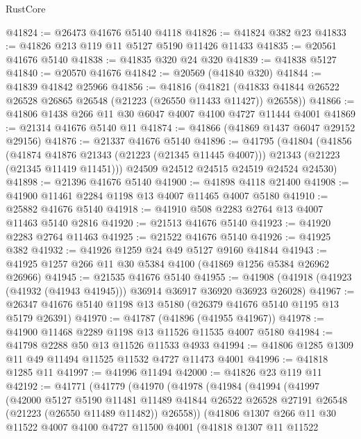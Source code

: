 \begin{lexlean}{RustCore}
\begin{coremodule}
@41824 := @26473 @41676 @5140 @4118
@41826 := @41824 @382 @23
@41833 := @41826 @213 @119 @11 @5127 @5190 @11426 @11433
@41835 := @20561 @41676 @5140
@41838 := @41835 @320 @24 @320
@41839 := @41838 @5127
@41840 := @20570 @41676
@41842 := @20569 (@41840 @320)
@41844 := @41839 @41842 @25966
@41856 := @41816
    (@41821 (@41833 @41844 @26522 @26528 @26865 @26548 (@21223 (@26550 @11433 @11427)) @26558))
@41866 := @41806 @1438 @266 @11 @30 @6047 @4007 @4100 @4727 @11444 @4001
@41869 := @21314 @41676 @5140 @11
@41874 := @41866 (@41869 @1437 @6047 @29152 @29156)
@41876 := @21337 @41676 @5140
@41896 := @41795
    (@41804
      (@41856
        (@41874 @41876 @21343 (@21223 (@21345 @11445 @4007)))
        @21343
        (@21223 (@21345 @11419 @11451)))
      @24509
      @24512
      @24515
      @24519
      @24524
      @24530)
@41898 := @21396 @41676 @5140
@41900 := @41898 @4118 @21400
@41908 := @41900 @11461 @2284 @1198 @13 @4007 @11465 @4007 @5180
@41910 := @25882 @41676 @5140
@41918 := @41910 @508 @2283 @2764 @13 @4007 @11463 @5140 @2816
@41920 := @21513 @41676 @5140
@41923 := @41920 @2283 @2764 @11463
@41925 := @21522 @41676 @5140
@41926 := @41925 @382
@41932 := @41926 @1259 @24 @49 @5127 @9160 @41844
@41943 := @41925 @1257 @266 @11 @30 @5384 @4100 (@41869 @1256 @5384 @26962 @26966)
@41945 := @21535 @41676 @5140
@41955 := @41908 (@41918 (@41923 (@41932 (@41943 @41945))) @36914 @36917 @36920 @36923 @26028)
@41967 := @26347 @41676 @5140 @1198 @13 @5180 (@26379 @41676 @5140 @1195 @13 @5179 @26391)
@41970 := @41787 (@41896 (@41955 @41967))
@41978 := @41900 @11468 @2289 @1198 @13 @11526 @11535 @4007 @5180
@41984 := @41798 @2288 @50 @13 @11526 @11533 @4933
@41994 := @41806 @1285 @1309 @11 @49 @11494 @11525 @11532 @4727 @11473 @4001
@41996 := @41818 @1285 @11
@41997 := @41996 @11494
@42000 := @41826 @23 @119 @11
@42192 := @41771
    (@41779
      (@41970
        (@41978
          (@41984
            (@41994
              (@41997
                (@42000
                  @5127
                  @5190
                  @11481
                  @11489
                  @41844
                  @26522
                  @26528
                  @27191
                  @26548
                  (@21223 (@26550 @11489 @11482))
                  @26558))
              (@41806
                @1307
                @266
                @11
                @30
                @11522
                @4007
                @4100
                @4727
                @11500
                @4001
                (@41818
                  @1307
                  @11
                  @11522

\end{coremodule}
\end{lexlean}
